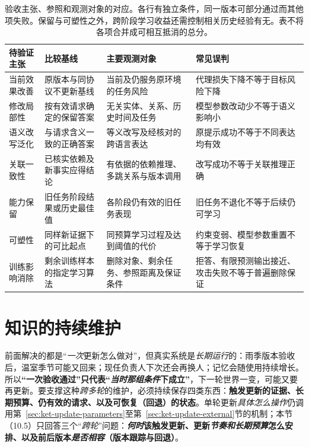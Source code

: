 \begin{table}[htbp]
\small
\begin{tabularx}{\linewidth}{@{}p{19mm}XXX@{}}
\toprule
待验证主张 & 比较基线 & 主要观测对象 & 常见误判 \\
\midrule
当前效果改善 & 原版本与同协议不更新基线 & 当前及仍服务原环境的任务风险 & 代理损失下降不等于目标风险下降 \\
修改局部性 & 按有效请求确定的保留答案 & 无关实体、关系、历史时间及任务 & 模型参数改动少不等于语义影响小 \\
语义改写泛化 & 与请求含义一致的正确答案 & 等义改写及经核对的跨语言表达 & 原提示成功不等于不同表达均有效 \\
关联一致性 & 已核实依赖及新事实应得结论 & 有依据的依赖推理、多跳关系与版本调用 & 改写成功不等于关联推理正确 \\
能力保留 & 旧任务阶段结果或历史最佳值 & 各阶段仍有效的旧任务表现 & 旧任务不退化不等于后续仍可学习 \\
可塑性 & 同样新证据下的可比起点 & 同预算学习过程及达到阈值的代价 & 约束变弱、模型参数重置不等于学习恢复 \\
训练影响消除 & 剩余训练样本的指定学习算法 & 删除对象、剩余任务、参照距离及保证条件 & 拒答、有限预测输出接近、攻击失败不等于普遍删除保证 \\
\bottomrule
\end{tabularx}
\caption{验收主张、参照和观测对象的对应。各行有独立条件，同一版本可部分通过而其他项失败。保留与可塑性之外，跨阶段学习收益还需控制相关历史经验有无。表不将各项合并成可相互抵消的总分。}
\label{tab:ket-update-validation}
\end{table}

\section{知识的持续维护}
\label{sec:ket-update-maintenance}

前面解决的都是“\emph{一次}更新怎么做对”，但真实系统是\emph{长期运行}的：雨季版本验收后，温室季节可能又回来；现任负责人下次还会再换人；记忆会随使用持续增长。所以\textbf{“一次验收通过”只代表“\emph{当时那组条件}下成立”}，下一轮世界一变，可能又要再更新。要支撑这种\emph{跨多轮}的维护，必须持续保存四类东西：\textbf{触发更新的证据、长期预算、仍有效的请求、以及可恢复（回退）的状态}。单轮更新\emph{具体怎么操作}仍调用第~\ref{sec:ket-update-parameters}至第~\ref{sec:ket-update-external}节的机制；本节（10.5）只回答三个“\emph{跨轮}”问题：\textbf{\emph{何时}该触发更新、更新\emph{节奏和长期预算}怎么安排、以及前后版本\emph{是否相容}（版本跟踪与回退）}。

